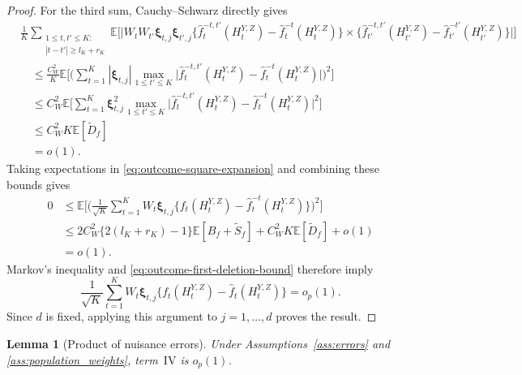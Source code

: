 \documentclass[12pt]{article}
\def\E{\mathbb{E}}
\newtheorem{lemma}[theorem]{Lemma}
\numberwithin{equation}{section}
\begin{document}
\begin{proof}
For the third sum, Cauchy--Schwarz directly gives
\begin{align*}
&\frac1K\sum_{\substack{1\leq t,t'\leq K:\\
|t-t'|\geq l_K+r_K}}
\E\Big[
\big|W_tW_{t'}\boldsymbol\xi_{t,j}\boldsymbol\xi_{t',j}
\big\{\hat f_t^{-t,t'}(H_t^{Y,Z})
-\hat f_t^{-t}(H_t^{Y,Z})\big\}\times
\big\{\hat f_{t'}^{-t,t'}(H_{t'}^{Y,Z})
-\hat f_{t'}^{-t'}(H_{t'}^{Y,Z})\big\}
\big|
\Big]\\
&\quad\leq\frac{C_W^2}{K}
\E\Big[
\Big(\sum_{t=1}^K|\boldsymbol\xi_{t,j}|
\max_{1\leq t'\leq K}
\big|\hat f_t^{-t,t'}(H_t^{Y,Z})
-\hat f_t^{-t}(H_t^{Y,Z})\big|\Big)^2
\Big]\\
&\quad\leq C_W^2
\E\Big[
\sum_{t=1}^K\boldsymbol\xi_{t,j}^2
\max_{1\leq t'\leq K}
\big|\hat f_t^{-t,t'}(H_t^{Y,Z})
-\hat f_t^{-t}(H_t^{Y,Z})\big|^2
\Big]\\
&\quad\leq C_W^2K\E[\tilde D_f]\\
&\quad=o(1).
\end{align*}
Taking expectations in \eqref{eq:outcome-square-expansion}
and combining these bounds gives
\begin{align*}
0
&\leq
\E\Bigg[
\Big(\frac1{\sqrt K}\sum_{t=1}^K
W_t\boldsymbol\xi_{t,j}
\big\{f_t(H_t^{Y,Z})-\hat f_t^{-t}(H_t^{Y,Z})\big\}
\Big)^2
\Bigg]\\
&\leq
2C_W^2\{2(l_K+r_K)-1\}\E[B_f+\tilde S_f]
+C_W^2K\E[\tilde D_f]+o(1)\\
&=o(1).
\end{align*}
Markov's inequality and \eqref{eq:outcome-first-deletion-bound}
therefore imply
\begin{equation}
\label{eq:termIII-converge}
\frac1{\sqrt K}\sum_{t=1}^K W_t\boldsymbol\xi_{t,j}
\big\{f_t(H_t^{Y,Z})-\hat f_t(H_t^{Y,Z})\big\}
=o_p(1).
\end{equation}
Since \(d\) is fixed, applying this argument to
\(j=1,\ldots,d\) proves the result.
\end{proof}

\begin{lemma}[Product of nuisance errors]
Under Assumptions~\ref{ass:errors} and \ref{ass:population_weights},
term~\(\mathrm{IV}\) is \(o_p(1)\).
\end{lemma}
\end{document}
